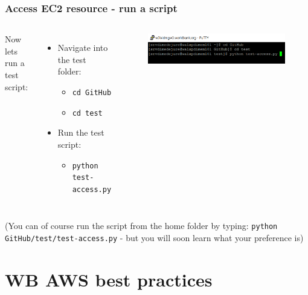 \documentclass[aspectratio=169]{beamer} %
\begin{document}
\begin{frame}
	\frametitle{Access EC2 resource - run a script}
	\vspace{1cm}
	\begin{columns}[c]
		Now lets run a test script:
		\begin{itemize}
			\item Navigate into the test folder:
			\begin{itemize}
				\item \texttt{cd GitHub}
				\item \texttt{cd test}
			\end{itemize}
			\item Run the test script:
			\begin{itemize}
				\item \texttt{python test-access.py}
			\end{itemize}
		\end{itemize}
		
		\begin{figure}
			\centering
			\includegraphics[width=\textwidth]{./img/access-5.png}
		\end{figure}
		
	\end{columns}
	
	\vspace{1cm}
	\small (You can of course run the script from the home folder by typing: \newline \texttt{python GitHub/test/test-access.py} - but you will soon learn what your preference is)

\end{frame}

\section{WB AWS best practices}
\end{document}
